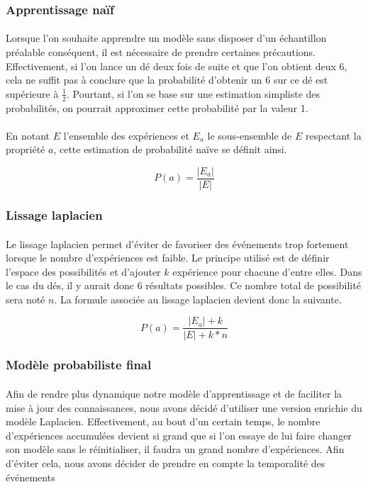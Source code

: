 
\subsubsection{Apprentissage naïf}
\paragraph{}
Lorsque l'on souhaite apprendre un modèle sans disposer d'un échantillon
préalable conséquent, il est nécessaire de prendre certaines précautions.
Effectivement, si l'on lance un dé deux fois de suite et que l'on obtient deux
6, cela ne suffit pas à conclure que la probabilité d'obtenir un 6 sur ce dé
est supérieure à $\frac{1}{2}$. Pourtant, si l'on se base sur une estimation
simpliste des probabilités, on pourrait approximer cette probabilité par la
valeur 1.

\paragraph{}
En notant $E$ l'ensemble des expériences et $E_a$ le sous-ensemble de $E$
respectant la propriété $a$, cette estimation de probabilité naïve se définit
ainsi.

$$P(a) = \frac{|E_a|}{|E|}$$

\subsubsection{Lissage laplacien}
\paragraph{}
Le lissage laplacien permet d'éviter de favoriser des événements trop
fortement lorsque le nombre d'expériences est faible. Le principe utilisé est
de définir l'espace des possibilités et d'ajouter $k$ expérience pour chacune
d'entre elles. Dans le cas du dés, il y aurait donc 6 résultats possibles. Ce
nombre total de possibilité sera noté $n$. La formule associée au lissage
laplacien devient donc la suivante.

$$P(a) = \frac{|E_a| + k}{|E| + k * n} $$

\subsubsection{Modèle probabiliste final}
\paragraph{}
Afin de rendre plus dynamique notre modèle d'apprentissage et de faciliter la
mise à jour des connaissances, nous avons décidé d'utiliser une version
enrichie du modèle Laplacien. Effectivement, au bout d'un certain temps,
le nombre d'expériences accumulées devient si grand que si l'on essaye de lui
faire changer son modèle sans le réinitialiser, il faudra un grand nombre
d'expériences. Afin d'éviter cela, nous avons décider de prendre en compte la
temporalité des événements

